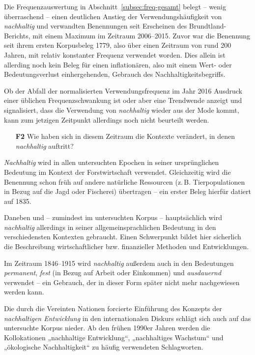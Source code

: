 \documentclass[
    german,
    a4paper,%
    12pt,%
    oneside,%
    toc=bibliography,
    final,
]{scrartcl}
\begin{document}
Die Frequenzauswertung in Abschnitt~\ref{subsec:freq-gesamt} belegt – wenig überraschend – einen deutlichen Anstieg der Verwendungshäufigkeit von \textit{nachhaltig} und verwandten Benennungen seit Erscheinen des Brundtland-Berichts, mit einem Maximum im Zeitraum 2006–2015. Zuvor war die Benennung seit ihrem ersten Korpusbeleg 1779, also über einen Zeitraum von rund 200 Jahren, mit relativ konstanter Frequenz verwendet worden. Dies allein ist allerding noch kein Beleg für einen inflationären, also mit einem Wert- oder Bedeutungsverlust einhergehenden, Gebrauch des Nachhaltigkeitsbegriffs.

Ob der Abfall der normalisierten Verwendungsfrequenz im Jahr 2016 Ausdruck einer üblichen Frequenzschwankung ist oder aber eine Trendwende anzeigt und signalisiert, dass die Verwendung von \textit{nachhaltig} wieder aus der Mode kommt, kann zum jetzigen Zeitpunkt allerdings noch nicht beurteilt werden.

\begin{enumerate}[rightmargin=1cm]
\item[\textbf{F2}] Wie haben sich in diesem Zeitraum die Kontexte verändert, in denen \textit{nachhaltig} auftritt?
\end{enumerate}

\textit{Nachhaltig} wird in allen untersuchten Epochen in seiner ursprünglichen Bedeutung im Kontext der Forstwirtschaft verwendet. Gleichzeitig wird die Benennung schon früh auf andere natürliche Ressourcen (z.\,B. Tierpopulationen in Bezug auf die Jagd oder Fischerei) übertragen – ein erster Beleg hierfür datiert auf 1835.

Daneben und – zumindest im untersuchten Korpus – hauptsächlich wird \textit{nachhaltig} allerdings in seiner allgemeinsprachlichen Bedeutung in den verschiedensten Kontexten gebraucht. Einen Schwerpunkt bildet hier sicherlich die Beschreibung wirtschaftlicher bzw. finanzieller Methoden und Entwicklungen.

Im Zeitraum 1846–1915 wird \textit{nachhaltig} außerdem auch in den Bedeutungen \textit{permanent}, \textit{fest} (in Bezug auf Arbeit oder Einkommen) und \textit{ausdauernd} verwendet – ein Gebrauch, der in dieser Form später nicht mehr nachgewiesen werden kann.

Die durch die Vereinten Nationen forcierte Einführung des Konzepts der \textit{nachhaltigen Entwicklung} in den internationalen Diskurs schlägt sich auch auf das untersuchte Korpus nieder. Ab den frühen 1990er Jahren werden die Kollokationen „nachhaltige Entwicklung“, „nachhaltiges Wachstum“ und „ökologische Nachhaltigkeit“ zu häufig verwendeten Schlagworten.
\end{document}

